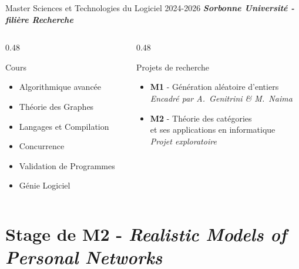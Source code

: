 \documentclass[aspectratio=169, 12pt]{beamer}
\begin{document}
\begin{frame}{Master Sciences et Technologies du Logiciel \hfill{\small 2024-2026}}
  \textit{\textbf{Sorbonne Université - filière Recherche}}
  \medskip

  \begin{columns}[T]
    \begin{column}{0.48\textwidth}
      \begin{block}{Cours}
        \begin{itemize}
          \item Algorithmique avancée
          \item Théorie des Graphes
          \item Langages et Compilation
          \item Concurrence
          \item Validation de Programmes
          \item Génie Logiciel
        \end{itemize}
      \end{block}
    \end{column}
    \begin{column}{0.48\textwidth}
      \begin{exampleblock}{Projets de recherche}
        \begin{itemize}
          \item \textbf{M1} - Génération aléatoire d'entiers\\
            {\small \textit{Encadré par A.~Genitrini \& M.~Naima}}
          \item \textbf{M2} - Théorie des catégories\\
            et ses applications en informatique\\
            {\small \textit{Projet exploratoire}}
        \end{itemize}
      \end{exampleblock}
    \end{column}
  \end{columns}
\end{frame}

\section{Stage de M2 - \textit{Realistic Models of Personal Networks}}
\end{document}
